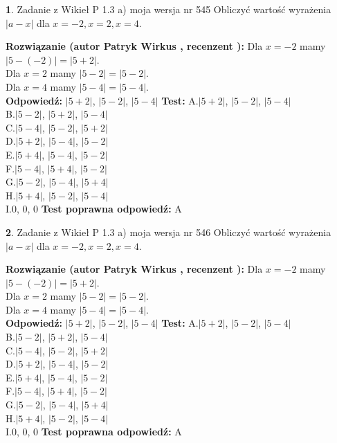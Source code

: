 \documentclass[12pt, a4paper]{article}
\theoremstyle{definition} %
\newtheorem{zad}{}
\newcommand{\zadStart}[1]{\begin{zad}#1\newline}
\newcommand{\zadStop}{\end{zad}}
\newcommand{\rozwStart}[2]{\noindent \textbf{Rozwiązanie (autor #1 , recenzent #2): }\newline}
\newcommand{\rozwStop}{\newline}
\newcommand{\odpStart}{\noindent \textbf{Odpowiedź:}\newline}
\newcommand{\odpStop}{\newline}
\newcommand{\testStart}{\noindent \textbf{Test:}\newline}
\newcommand{\testStop}{\newline}
\newcommand{\kluczStart}{\noindent \textbf{Test poprawna odpowiedź:}\newline}
\newcommand{\kluczStop}{\newline}
\begin{document}
\zadStart{Zadanie z Wikieł P 1.3 a) moja wersja nr 545}
Obliczyć wartość wyrażenia $|a - x|$ dla $x=-2,x=2,x=4$.
\zadStop
\rozwStart{Patryk Wirkus}{}
Dla $x = -2$ mamy $|5 - (-2)| = |5 + 2|$.\\
Dla $x = 2$ mamy $|5 - 2| = |5 - 2|$.\\
Dla $x = 4$ mamy $|5 - 4| = |5 - 4|$.\\
\rozwStop
\odpStart
$|5 + 2|$, $|5 - 2|$, $|5 - 4|$
\odpStop
\testStart
A.$|5 + 2|$, $|5 - 2|$, $|5 - 4|$\\
B.$|5 - 2|$, $|5 + 2|$, $|5 - 4|$\\
C.$|5 - 4|$, $|5 - 2|$, $|5 + 2|$\\
D.$|5 + 2|$, $|5 - 4|$, $|5 - 2|$\\
E.$|5 + 4|$, $|5 - 4|$, $|5 - 2|$\\
F.$|5 - 4|$, $|5 + 4|$, $|5 - 2|$\\
G.$|5 - 2|$, $|5 - 4|$, $|5 + 4|$\\
H.$|5 + 4|$, $|5 - 2|$, $|5 - 4|$\\
I.$0$, $0$, $0$
\testStop
\kluczStart
A
\kluczStop



\zadStart{Zadanie z Wikieł P 1.3 a) moja wersja nr 546}
Obliczyć wartość wyrażenia $|a - x|$ dla $x=-2,x=2,x=4$.
\zadStop
\rozwStart{Patryk Wirkus}{}
Dla $x = -2$ mamy $|5 - (-2)| = |5 + 2|$.\\
Dla $x = 2$ mamy $|5 - 2| = |5 - 2|$.\\
Dla $x = 4$ mamy $|5 - 4| = |5 - 4|$.\\
\rozwStop
\odpStart
$|5 + 2|$, $|5 - 2|$, $|5 - 4|$
\odpStop
\testStart
A.$|5 + 2|$, $|5 - 2|$, $|5 - 4|$\\
B.$|5 - 2|$, $|5 + 2|$, $|5 - 4|$\\
C.$|5 - 4|$, $|5 - 2|$, $|5 + 2|$\\
D.$|5 + 2|$, $|5 - 4|$, $|5 - 2|$\\
E.$|5 + 4|$, $|5 - 4|$, $|5 - 2|$\\
F.$|5 - 4|$, $|5 + 4|$, $|5 - 2|$\\
G.$|5 - 2|$, $|5 - 4|$, $|5 + 4|$\\
H.$|5 + 4|$, $|5 - 2|$, $|5 - 4|$\\
I.$0$, $0$, $0$
\testStop
\kluczStart
A
\kluczStop
\end{document}
